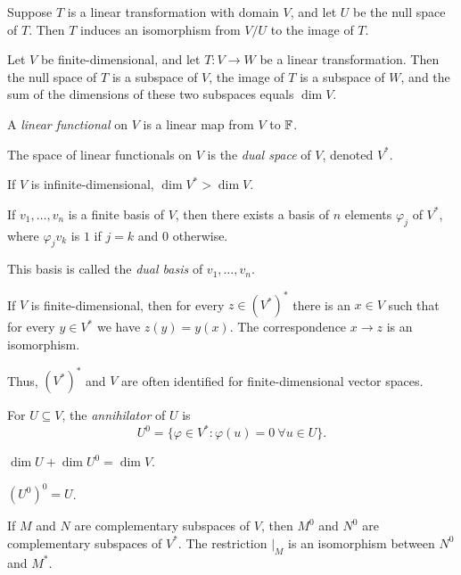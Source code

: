 \begin{prop}
  Suppose $T$ is a linear transformation with domain $V$, and let $U$ be the
  null space of $T$.
  Then $T$ induces an isomorphism from $V/U$ to the image of $T$.
\end{prop}
\begin{cor}
  Let $V$ be finite-dimensional, and
  let $T:V\to W$ be a linear transformation. Then the null space of $T$ is a
  subspace of $V$, the image of $T$ is a subspace of $W$, and the sum of the
  dimensions of these two subspaces equals $\dim V$.
\end{cor}
\begin{defn}
  A \emph{linear functional} on $V$ is a linear map from $V$ to $\mathbb{F}$.

  The space of linear functionals on $V$ is the \emph{dual space} of $V$,
  denoted $V^*$.
\end{defn}
\begin{prop}
  If $V$ is infinite-dimensional, $\dim V^*>\dim V$.
\end{prop}
\begin{prop}
  If $v_1,\ldots,v_n$ is a finite basis of $V$, then there exists a basis of $n$
  elements $\varphi_j$ of $V^*$, where $\varphi_j v_k$ is $1$ if $j=k$ and $0$
  otherwise.
\end{prop}
\begin{defn}
  This basis is called the \emph{dual basis} of
  $v_1,\ldots,v_n$.
\end{defn}
\begin{prop}
  If $V$ is finite-dimensional, then for every $z\in (V^*)^*$ there is an $x\in V$
  such that for every $y\in V^*$ we have $z(y)=y(x)$. The correspondence $x\to z$
  is an isomorphism.
\end{prop}
\begin{rem}
  Thus, $(V^*)^*$ and $V$ are often identified for finite-dimensional vector
  spaces.
\end{rem}
\begin{defn}
  For $U\subseteq V$, the \emph{annihilator} of $U$ is
  \[U^0=\{\varphi\in V^*: \varphi(u)=0\ \forall u\in U\}.\]
\end{defn}
\begin{prop}
  $\dim U+\dim U^0=\dim V$.
\end{prop}
\begin{prop}
  $(U^0)^0=U$.
\end{prop}
\begin{prop}
  If $M$ and $N$ are complementary subspaces of $V$, then $M^0$ and $N^0$ are
  complementary subspaces of $V^*$. The restriction $|_M$ is an isomorphism
  between $N^0$ and $M^*$.
\end{prop}

